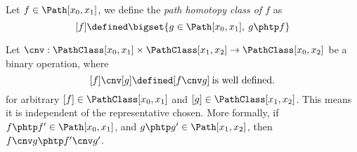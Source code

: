 \documentclass[../main-v2-manifolds.tex]{subfiles}
\begin{document}
\begin{definition}
    Let $ f\in\Path[x_0,x_1]$, we define the \emph{path homotopy class of $f$} as 
    \[
        [f]\defined\bigset{g\in\Path[x_0,x_1],\: g\phtp f}
    \]
\end{definition}
\begin{definition}\label{munkres:product-of-pathclasses}
    Let $\cnv: \PathClass[x_0,x_1]\times\PathClass[x_1,x_2]\to \PathClass[x_0,x_2]$ be a binary operation, where 
    \[
        [f]\cnv[g]\defined [f\cnv g]\: {\text{is well defined.}}
    \]
    for arbitrary $[f]\in \PathClass[x_0,x_1]$ and $[g]\in \PathClass[x_1,x_2]$. This means it is independent of the representative chosen. More formally, if $f\phtp f'\in\Path[x_0,x_1]$, and $g\phtp g'\in\Path[x_1,x_2]$, then $f\cnv g\phtp f'\cnv g'$.
\end{definition}
\end{document}
